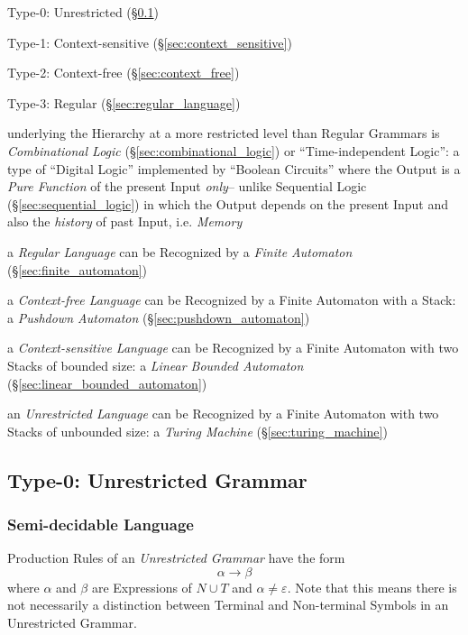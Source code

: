 Type-0: Unrestricted (\S\ref{sec:unrestricted_grammar})

Type-1: Context-sensitive (\S\ref{sec:context_sensitive})

Type-2: Context-free (\S\ref{sec:context_free})

Type-3: Regular (\S\ref{sec:regular_language})

underlying the Hierarchy at a more restricted level than Regular
Grammars is \emph{Combinational Logic}
(\S\ref{sec:combinational_logic}) or ``Time-independent Logic'': a
type of ``Digital Logic'' implemented by ``Boolean Circuits'' where
the Output is a \emph{Pure Function} of the present Input
\emph{only}-- unlike Sequential Logic (\S\ref{sec:sequential_logic})
in which the Output depends on the present Input and also the
\emph{history} of past Input, i.e. \emph{Memory}

a \emph{Regular Language} can be Recognized by a \emph{Finite
  Automaton} (\S\ref{sec:finite_automaton})

a \emph{Context-free Language} can be Recognized by a Finite Automaton
with a Stack: a \emph{Pushdown Automaton}
(\S\ref{sec:pushdown_automaton})

a \emph{Context-sensitive Language} can be Recognized by a Finite
Automaton with two Stacks of bounded size: a \emph{Linear Bounded
  Automaton} (\S\ref{sec:linear_bounded_automaton})

an \emph{Unrestricted Language} can be Recognized by a Finite
Automaton with two Stacks of unbounded size: a \emph{Turing Machine}
(\S\ref{sec:turing_machine})



\subsection{Type-0: Unrestricted Grammar}\label{sec:unrestricted_grammar}

\subsubsection{Semi-decidable Language}\label{sec:semidecidable}

Production Rules of an \emph{Unrestricted Grammar} have the form
\[
  \alpha \rightarrow \beta
\]
where $\alpha$ and $\beta$ are Expressions of $N \cup T$ and $\alpha
\neq \varepsilon$. Note that this means there is not necessarily a
distinction between Terminal and Non-terminal Symbols in an
Unrestricted Grammar.

